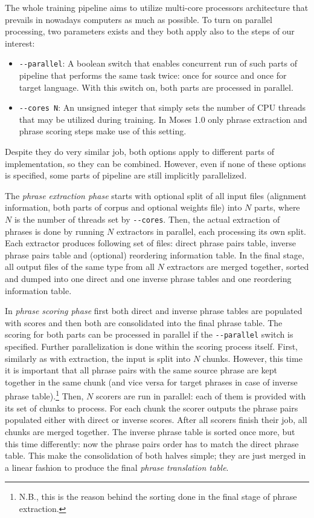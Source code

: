 The whole training pipeline aims to utilize multi-core processors architecture that
prevails in nowadays computers as much as possible. To turn on parallel processing,
two parameters exists and they both apply also to the steps of our interest:
\begin{itemize}
  \item \verb|--parallel|: A boolean switch that enables concurrent run of such parts of
  pipeline that performs the same task twice: once for source and once for target language.
  With this switch on, both parts are processed in parallel.
  \item \verb|--cores N|: An unsigned integer that simply sets the number of CPU threads
  that may be utilized during training. In Moses 1.0 only phrase extraction and phrase
  scoring steps make use of this setting.
\end{itemize}
Despite they do very similar job, both options apply to different parts
of implementation, so they can be combined.
However, even if none of these options is specified, some parts of pipeline
are still implicitly parallelized.

The \emph{phrase extraction phase} starts with optional split of all input files
(alignment information, both parts of corpus and optional weights file) into $N$
parts, where $N$ is the number of threads set by \verb|--cores|.
Then, the actual extraction of phrases is done by running $N$ extractors in parallel,
each processing its own split.
Each extractor produces following set of files: direct phrase pairs table, inverse
phrase pairs table and (optional) reordering information table.
In the final stage, all output files of the same type from all $N$ extractors are
merged together, sorted and dumped into one direct and one inverse phrase tables
and one reordering information table.

In \emph{phrase scoring phase} first both direct and inverse phrase tables are
populated with scores and then both are consolidated into the final phrase table.
The scoring for both parts can be processed in parallel if the \verb|--parallel|
switch is specified.
Further parallelization is done within the scoring process itself.
First, similarly as with extraction, the input is split into $N$ chunks.
However, this time it is important that all phrase pairs with the same source
phrase are kept together in the same chunk (and vice versa for target phrases
in case of inverse phrase table).\footnote{N.B., this is the reason behind the sorting done in the final stage of phrase extraction.}
Then, $N$ scorers are run in parallel: each of them is provided with its set
of chunks to process.
For each chunk the scorer outputs the phrase pairs populated either with direct
or inverse scores.
After all scorers finish their job, all chunks are merged together.
The inverse phrase table is sorted once more, but this time differently:
now the phrase pairs order has to match the direct phrase table.
This make the consolidation of both halves simple; they are just merged
in a linear fashion to produce the final \emph{phrase translation table}.

